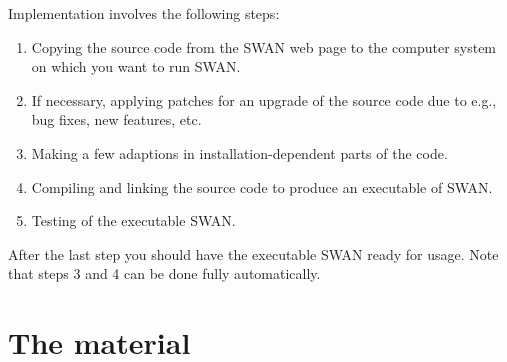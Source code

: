 \documentclass[12pt]{book}
\begin{document}
\noindent
Implementation involves the following steps:
\begin{enumerate}
   \item Copying the source code from the SWAN web page to the computer system
         on which you want to run SWAN.
   \item If necessary, applying patches for an upgrade of the source code due to
         e.g., bug fixes, new features, etc.
   \item Making a few adaptions in installation-dependent parts of the code.
   \item Compiling and linking the source code to produce an executable of SWAN.
   \item Testing of the executable SWAN.
\end{enumerate}
After the last step you should have the executable SWAN ready for usage. Note
that steps 3 and 4 can be done fully automatically.

\section{The material}
\end{document}
